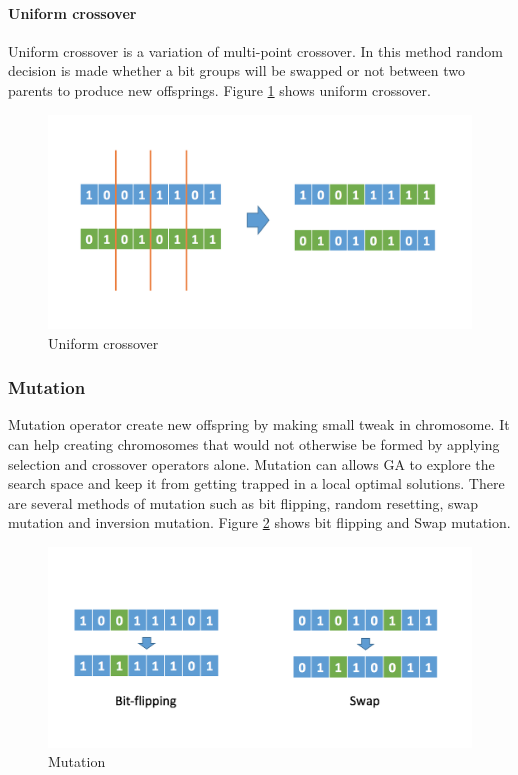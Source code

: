 \paragraph{Uniform crossover}
Uniform crossover is a variation of multi-point crossover. In this method random decision is made whether a bit groups will be swapped or not between two parents to produce new offsprings. Figure \ref{fig:uniform-cross} shows uniform crossover. 

\begin{figure}[!htb]
  \includegraphics[width=\linewidth]{figs/uniform_crossover.png}
  \caption{Uniform crossover}
  \label{fig:uniform-cross}
\end{figure}
\citep{Murphy:03}

\subsubsection{Mutation}
Mutation operator create new offspring by making small tweak in chromosome. It can help creating chromosomes that would not otherwise be formed by applying selection and crossover operators alone. Mutation can allows GA to explore the search space and keep it from getting trapped in a local optimal solutions. There are several methods of mutation such as bit flipping, random resetting, swap mutation and inversion mutation\citep{tutp.com:98ga}. Figure \ref{fig:mutation} shows bit flipping and Swap mutation.

\begin{figure}[!htb]
  \includegraphics[width=\linewidth]{figs/mutation.png}
  \caption{Mutation}
  \label{fig:mutation}
\end{figure}

